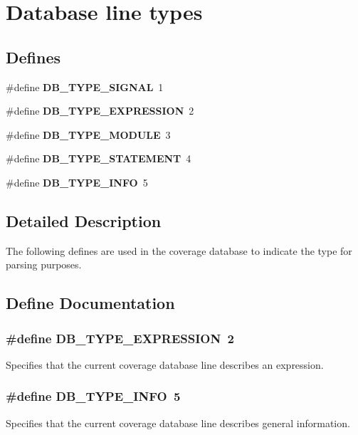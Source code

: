 \section{Database line types}
\label{group__db__types}
\subsection*{Defines}
\begin{CompactItemize}
\item 
\#define {\bf DB\_\-TYPE\_\-SIGNAL}\ 1
\item 
\#define {\bf DB\_\-TYPE\_\-EXPRESSION}\ 2
\item 
\#define {\bf DB\_\-TYPE\_\-MODULE}\ 3
\item 
\#define {\bf DB\_\-TYPE\_\-STATEMENT}\ 4
\item 
\#define {\bf DB\_\-TYPE\_\-INFO}\ 5
\end{CompactItemize}


\subsection{Detailed Description}
The following defines are used in the coverage database to indicate the type for parsing purposes. 

\subsection{Define Documentation}
\subsubsection{\setlength{\rightskip}{0pt plus 5cm}\#define DB\_\-TYPE\_\-EXPRESSION\ 2}\label{group__db__types_a1}


Specifies that the current coverage database line describes an expression. 
\subsubsection{\setlength{\rightskip}{0pt plus 5cm}\#define DB\_\-TYPE\_\-INFO\ 5}\label{group__db__types_a4}


Specifies that the current coverage database line describes general information. 
